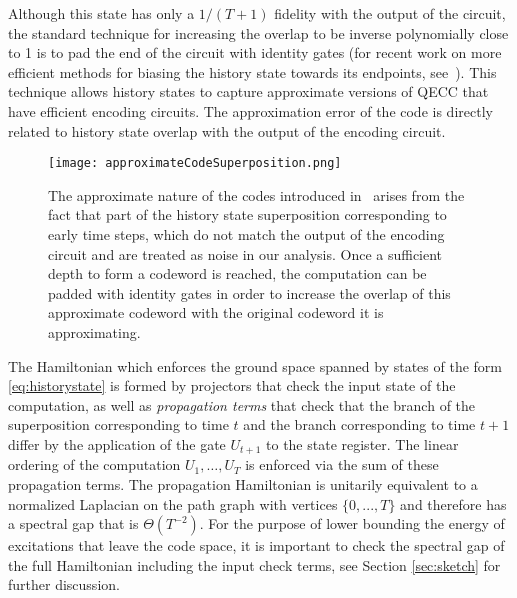 \documentclass[11pt,letterpaper]{article}
\theoremstyle{definition}
\theoremstyle{remark}
\numberwithin{equation}{section}
\theoremstyle{definition}
\begin{document}
Although this state has only a $1/(T+1)$ fidelity with the output of the circuit, the standard technique for increasing the overlap to be inverse polynomially close to 1 is to pad the end of the circuit with identity gates (for recent work on more efficient methods for biasing the history state towards its endpoints, see~\cite{Bausch2018analysislimitations, caha2018clocks}).  This technique allows history states to capture approximate versions of QECC that have efficient encoding circuits.  The approximation error of the code is directly related to history state overlap with the output of the encoding circuit.  

\begin{figure}[h!]
\begin{center}
\texttt{[image: approximateCodeSuperposition.png]}
\end{center}
\caption{The approximate nature of the codes introduced in~\cite{nirkhe_et_al:LIPIcs:2018:9095} arises from the fact that part of the history state superposition corresponding to early time steps, which do not match the output of the encoding circuit and are treated as noise in our analysis.  Once a sufficient depth to form a codeword is reached, the computation can be padded with identity gates in order to increase the overlap of this approximate codeword with the original codeword it is approximating.}
\end{figure}

The Hamiltonian which enforces the ground space spanned by states of the form \eqref{eq:historystate} is formed by projectors that check the input state of the computation, as well as \emph{propagation terms} that check that the branch of the superposition corresponding to time $t$ and the branch corresponding to time $t+1$ differ by the application of the gate $U_{t+1}$ to the state register. The linear ordering of the computation $U_1,\ldots,U_T$ is enforced via the sum of these propagation terms.  The propagation Hamiltonian is unitarily equivalent to a normalized Laplacian on the path graph with vertices $\{0,...,T\}$ and therefore has a spectral gap that is $\Theta(T^{-2})$.  For the purpose of lower bounding the energy of excitations that leave the code space, it is important to check the spectral gap of the full Hamiltonian including the input check terms, see Section \ref{sec:sketch} for further discussion.  
\end{document}
